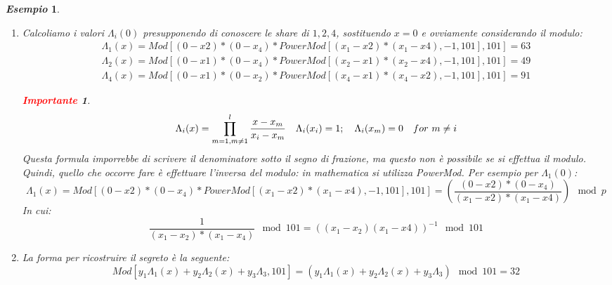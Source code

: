 \documentclass{book}
\newtheorem*{Importante}{\textbf{\textcolor{red}{Importante}}}
\newtheorem{esempio}{\emph{Esempio}}
\begin{document}
\begin{esempio}
\begin{enumerate}
        \item Calcoliamo i valori \(\Lambda_{i}(0) \) presupponendo di conoscere le share di \(1,2,4\), sostituendo \(x=0\) e ovviamente considerando il modulo:
              \begin{equation*}
                  \begin{matrix}
                      \Lambda_{1}(x)= Mod[(0-x{2})*(0-x_{4})*PowerMod[(x_{1}-x{2})*(x_{1}-x{4}),-1,101],101]=63 \\
                      \Lambda_{2}(x)= Mod[(0-x{1})*(0-x_{4})*PowerMod[(x_{2}-x{1})*(x_{2}-x{4}),-1,101],101]=49 \\
                      \Lambda_{4}(x)= Mod[(0-x{1})*(0-x_{2})*PowerMod[(x_{4}-x{1})*(x_{4}-x{2}),-1,101],101]=91
                  \end{matrix}
              \end{equation*}
              \begin{Importante}
                  \begin{equation*}
                      \centering
                      \Lambda_{i}(x)=\prod_{m=1,m\neq1}^{l}{\frac{x-x_{m}}{x_{i}-x_{m}}}\quad \Lambda_{i}(x_{i})=1;\quad \Lambda_{i}(x_{m})=0\quad for\ m\neq i
                  \end{equation*}
                  Questa formula imporrebbe di scrivere il denominatore sotto il segno di frazione, ma questo non è possibile se si effettua il modulo\@. Quindi, quello che occorre fare è effettuare l'inversa del modulo: in mathematica si utilizza PowerMod. Per esempio per \(\Lambda_{1}(0)\):
                  \begin{equation*}
                      \Lambda_{1}(x)= Mod[(0-x{2})*(0-x_{4})*PowerMod[(x_{1}-x{2})*(x_{1}-x{4}),-1,101],101]=(\frac{(0-x{2})*(0-x_{4})}{(x_{1}-x{2})*(x_{1}-x{4})})\mod{p}
                  \end{equation*}
                  In cui:
                  \begin{equation*}
                      \frac{1}{(x_{1}-x_{2})*(x_{1}-x_{4})}\mod{101}=
                      {((x_{1}-x_{2})(x_{1}-x{4}))}^{-1}\mod{101}
                  \end{equation*}
              \end{Importante}
        \item La forma per ricostruire il segreto è la seguente:
              \begin{equation*}
                  Mod[y_{1}\Lambda_{1}(x)+y_{2}\Lambda_{2}(x)+y_{3}\Lambda_{3},101]=(y_{1}\Lambda_{1}(x)+y_{2}\Lambda_{2}(x)+y_{3}\Lambda_{3})\mod{101}=32

\end{equation*}
\end{enumerate}
\end{esempio}
\end{document}

